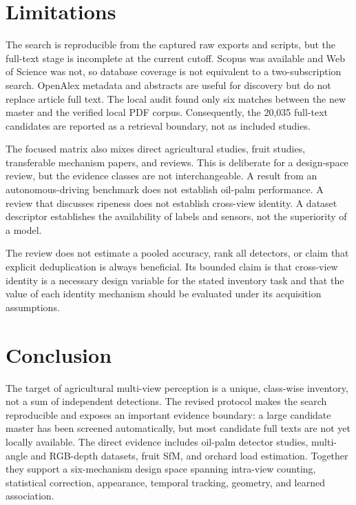 \section{Limitations}
\label{sec:limitations2}

The search is reproducible from the captured raw exports and scripts, but the full-text stage is incomplete at the current cutoff. Scopus was available and Web of Science was not, so database coverage is not equivalent to a two-subscription search. OpenAlex metadata and abstracts are useful for discovery but do not replace article full text. The local audit found only six matches between the new master and the verified local PDF corpus. Consequently, the 20,035 full-text candidates are reported as a retrieval boundary, not as included studies.

The focused matrix also mixes direct agricultural studies, fruit studies, transferable mechanism papers, and reviews. This is deliberate for a design-space review, but the evidence classes are not interchangeable. A result from an autonomous-driving benchmark does not establish oil-palm performance. A review that discusses ripeness does not establish cross-view identity. A dataset descriptor establishes the availability of labels and sensors, not the superiority of a model.

The review does not estimate a pooled accuracy, rank all detectors, or claim that explicit deduplication is always beneficial. Its bounded claim is that cross-view identity is a necessary design variable for the stated inventory task and that the value of each identity mechanism should be evaluated under its acquisition assumptions.

\section{Conclusion}
\label{sec:conclusion2}

The target of agricultural multi-view perception is a unique, class-wise inventory, not a sum of independent detections. The revised protocol makes the search reproducible and exposes an important evidence boundary: a large candidate master has been screened automatically, but most candidate full texts are not yet locally available. The direct evidence includes oil-palm detector studies, multi-angle and RGB-depth datasets, fruit SfM, and orchard load estimation. Together they support a six-mechanism design space spanning intra-view counting, statistical correction, appearance, temporal tracking, geometry, and learned association.

